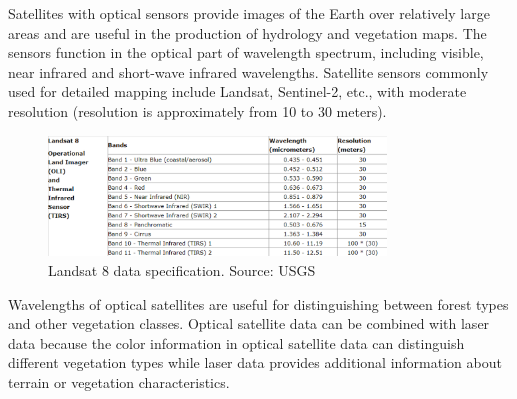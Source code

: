 Satellites with optical sensors provide images of the Earth over relatively large areas and are useful in the production of hydrology and vegetation maps. The sensors function in the optical part of wavelength spectrum, including visible, near infrared and short-wave infrared wavelengths. Satellite sensors commonly used for detailed mapping include Landsat, Sentinel-2, etc., with moderate resolution (resolution is approximately from 10 to 30 meters).
\begin{figure}
	\centering
	\includegraphics[width=0.8\textwidth]{figures/wavelengthL8.png}
	\caption{Landsat 8 data specification. Source: USGS}
\end{figure}
Wavelengths of optical satellites are useful for distinguishing between forest types and other vegetation classes. Optical satellite data can be combined with laser data because the color information in optical satellite data can distinguish different vegetation types while laser data provides additional information about terrain or vegetation characteristics. 
